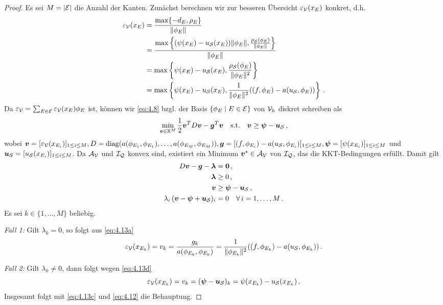 \begin{proof}
Es sei $M = \lvert \mathcal E\rvert$ die Anzahl der Kanten. Zunächst berechnen wir zur besseren Übersicht $\varepsilon_{\mathcal V}(x_E)$ konkret, d.h.
\begin{align}\notag
	\varepsilon_{\mathcal V} (x_E) & =  \frac{\max \{-d_E,\rho_E\}}{\lVert \phi_E\rVert} \\
	\notag
	& = \frac{\max \left\{(\psi (x_E)-u_{\mathcal S}(x_E) )\lVert \phi_E\rVert ,\frac{\rho_{\mathcal S}(\phi_E)}{\lVert \phi_E\rVert}\right\}}{\lVert \phi_E\rVert} \\
	\notag
	& = \max \left\{\psi (x_E)-u_{\mathcal S}(x_E)  ,\frac{\rho_{\mathcal S}(\phi_E)}{\lVert \phi_E\rVert^2}\right\} \\
	\label{eq:4.12}
	& = \max \left\{\psi (x_E)-u_{\mathcal S}(x_E)  ,\frac 1{\lVert \phi_E\rVert^2} ((f,\phi_E)-a(u_{\mathcal S},\phi_E))	\right\} \, .
\end{align}
Da  $\varepsilon_{\mathcal V} = \sum_{E \in \mathcal E} \varepsilon_{\mathcal V}(x_E) \phi_E$ ist, können wir \eqref{eq:4.8} bzgl. der Basis $\{\phi_E \mid E \in \mathcal E\}$ von $\mathcal V_h$ diskret schreiben als
\begin{align*}
	\min_{\boldsymbol v \in \mathbb{R}^M} \frac 1 2 \boldsymbol v^T D \boldsymbol v - \boldsymbol g^T \boldsymbol v \quad \text{s.t.} \quad\boldsymbol v \ge \boldsymbol \psi - \boldsymbol u_{\mathcal S}\, , 
\end{align*}
wobei $\boldsymbol v = [\varepsilon_{\mathcal V}(x_{E_i})]_{1\le i \le M}, D = \operatorname{diag}(a(\phi_{E_1},\phi_{E_1}),\ldots,a(\phi_{E_M},\phi_{E_M})), \boldsymbol g = [(f,\phi_{E_i})-a(u_{\mathcal S},\phi_{E_i})]_{1\le i\le M}, \boldsymbol \psi = [\psi(x_{E_i})]_{1\le i \le M}$ und $ \boldsymbol u_{\mathcal S} = [u_{\mathcal S}(x_{E_i})]_{1\le i \le M}$. Da $\mathcal A_{\mathcal V}$ und $\mathcal I_{\mathcal Q}$ konvex sind, existiert ein Minimum $\boldsymbol v^* \in \mathcal A_{\mathcal V}$ von $\mathcal I_{\mathcal Q}$, das die KKT-Bedingungen erfüllt. Damit gilt
\begin{subequations}\label{eq:4.13}
\begin{align}\label{eq:4.13a}
	D \boldsymbol v-\boldsymbol g - \boldsymbol \lambda & = \boldsymbol 0 \, , \\
	\label{eq:4.13b}
	\boldsymbol \lambda &\ge 0\, ,\\
	\label{eq:4.13c}
	\boldsymbol v & \ge \boldsymbol \psi - \boldsymbol u_{\mathcal S}\,  , \\
	\label{eq:4.13d}
	\lambda_i\, (\boldsymbol v - \boldsymbol \psi+\boldsymbol u_{\mathcal S})_i &= 0 \quad \forall \, i=1,\ldots,M \, .
\end{align}
\end{subequations}
Es sei $k \in \{1,\ldots,M\}$ beliebig.

\textit{Fall 1:} Gilt $\lambda_k = 0$, so folgt aus \eqref{eq:4.13a}
\[
	\varepsilon_{\mathcal V} (x_{E_k}) = v_k = \frac {g_k}{a(\phi_{E_k},\phi_{E_k})} = \frac 1{\lVert \phi_{E_k}\rVert^2} ((f,\phi_{E_k})-a(u_{\mathcal S},\phi_{E_k})) \, .
\]

\textit{Fall 2:} Gilt $\lambda_k \not= 0$, dann folgt wegen \eqref{eq:4.13d}
\[
	\varepsilon_{\mathcal V} (x_{E_k}) =v_k = (\boldsymbol \psi - \boldsymbol u_{\mathcal S})_k = \psi(x_{E_k}) - u_{\mathcal S}(x_{E_k})\, .
\]
Insgesamt folgt mit \eqref{eq:4.13c} und \eqref{eq:4.12} die Behauptung.
\end{proof}


